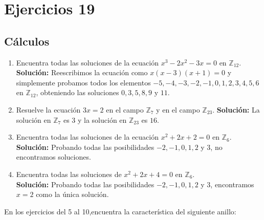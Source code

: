 \section*{Ejercicios 19}


\subsection*{Cálculos}
\begin{enumerate}
	\item Encuentra todas las soluciones de la ecuación $x^3 - 2x^2 - 3x = 0$ en $\mathbb{Z}_{12}$. \textbf{Solución:}
	 Reescribimos la ecuación como $x(x - 3)(x + 1) = 0$ y simplemente probamos todos los elementos $-5, -4, -3, -2, -1, 0, 1, 2, 3, 4, 5, 6$ en $\mathbb{Z}_{12}$, obteniendo las soluciones $0, 3, 5, 8, 9$ y $11$.
	\item Resuelve la ecuación $3x = 2$ en el campo $\mathbb{Z}_7$ y en el campo $\mathbb{Z}_{23}$. \textbf{Solución:}
	 La solución en $\mathbb{Z}_7$ es $3$ y la solución en $\mathbb{Z}_{23}$ es $16$.
	\item Encuentra todas las soluciones de la ecuación $x^2 + 2x + 2 = 0$ en $\mathbb{Z}_6$. \textbf{Solución:} Probando todas las posibilidades $-2, -1, 0, 1, 2$ y $3$, no encontramos soluciones.
	\item Encuentra todas las soluciones de $x^2 + 2x + 4 = 0$ en $\mathbb{Z}_6$.
	\\ \textbf{Solución:}
	Probando todas las posibilidades $-2, -1, 0, 1, 2$ y $3$, encontramos $x = 2$ como la única solución.
	
\end{enumerate}
En los ejercicios del 5 al 10,encuentra la característica del siguiente anillo:
